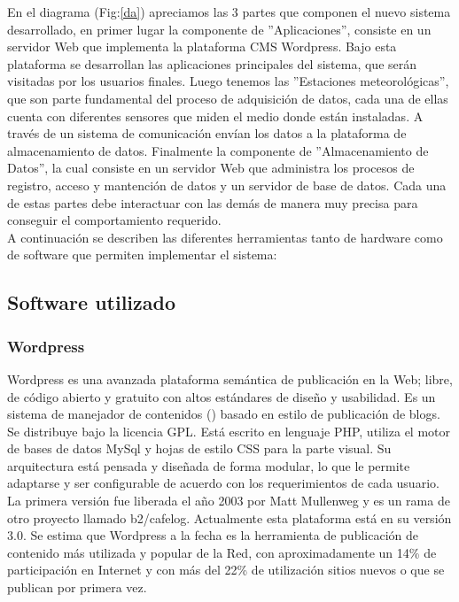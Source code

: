 En el diagrama (Fig:\ref{da}) apreciamos las 3 partes que componen el nuevo sistema desarrollado, en primer lugar la componente de ''Aplicaciones'', consiste en un servidor Web que implementa la plataforma CMS Wordpress. Bajo esta plataforma se desarrollan las aplicaciones principales del sistema, que serán visitadas por los usuarios finales. Luego tenemos las ''Estaciones meteorológicas'', que son parte fundamental del proceso de adquisición de datos, cada una de ellas cuenta con diferentes sensores que miden el medio donde están instaladas. A través de un sistema de comunicación envían los datos a la plataforma de almacenamiento de datos. Finalmente la componente de ''Almacenamiento de Datos'', la cual consiste en un servidor Web que administra los procesos de registro, acceso y mantención de datos y un servidor de base de datos. Cada una de estas partes debe interactuar con las demás de manera muy precisa para conseguir el comportamiento requerido.\\

A continuación se describen las diferentes herramientas tanto de hardware como de software que permiten implementar el sistema:

\subsection{Software utilizado}
\subsubsection{Wordpress}
Wordpress es una avanzada plataforma semántica de publicación en la Web; libre, de código abierto y gratuito con altos estándares de diseño y usabilidad. Es un sistema de manejador de contenidos () basado en estilo de publicación de blogs. Se distribuye bajo la licencia GPL. Está escrito en lenguaje PHP, utiliza el motor de bases de datos MySql y hojas de estilo CSS para la parte visual. Su arquitectura está pensada y diseñada de forma modular, lo que le permite adaptarse y ser configurable de acuerdo con los requerimientos de cada usuario.\\

La primera versión fue liberada el año 2003 por Matt Mullenweg y es un rama de otro proyecto llamado b2/cafelog. Actualmente esta plataforma está en su versión 3.0. Se estima que Wordpress a la fecha es la herramienta de publicación de contenido más utilizada y popular de la Red, con aproximadamente un 14\% de participación en Internet y con más del 22\% de utilización sitios nuevos o que se publican por primera vez\cite{software:usoWordpress}.\\

